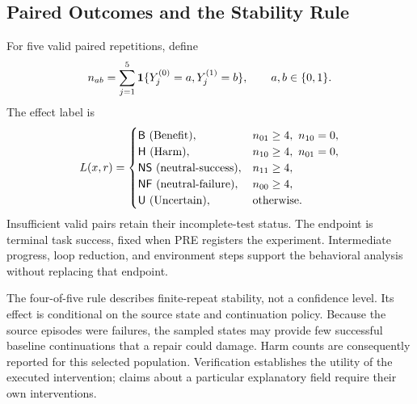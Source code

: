 \subsection{Paired Outcomes and the Stability Rule}
\label{app:labels}
For five valid paired repetitions, define
\begin{equation}
n_{ab}=\sum_{j=1}^{5}\mathbf{1}\{Y_j^{(0)}=a,Y_j^{(1)}=b\},
\qquad a,b\in\{0,1\}.
\label{eq:counts}
\end{equation}
The effect label is
\begin{equation}
L(x,r)=\begin{cases}
\mathsf{B}\ \text{(Benefit)},&n_{01}\ge4,\ n_{10}=0,\\
\mathsf{H}\ \text{(Harm)},&n_{10}\ge4,\ n_{01}=0,\\
\mathsf{NS}\ \text{(neutral-success)},&n_{11}\ge4,\\
\mathsf{NF}\ \text{(neutral-failure)},&n_{00}\ge4,\\
\mathsf{U}\ \text{(Uncertain)},&\text{otherwise}.
\end{cases}
\label{eq:labels}
\end{equation}
Insufficient valid pairs retain their incomplete-test status. The endpoint
is terminal task success, fixed when PRE registers the experiment.
Intermediate progress, loop reduction, and environment steps support the
behavioral analysis without replacing that endpoint.

The four-of-five rule describes finite-repeat stability, not a confidence
level. Its effect is conditional on the source state and continuation
policy. Because the source episodes were failures, the sampled states may
provide few successful baseline continuations that a repair could damage.
Harm counts are consequently reported for this selected population.
Verification establishes the utility of the executed intervention; claims
about a particular explanatory field require their own interventions.

